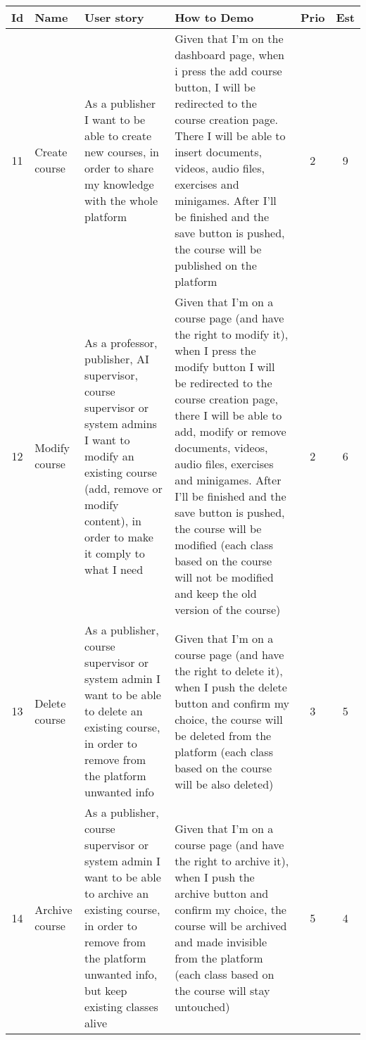 \begin{tabular}{|c|m{1.5cm}|m{4cm}|m{4cm}|c|c|}
	\hline
	\textbf{Id}&\textbf{Name}&\textbf{User story}&\textbf{How to Demo}&\textbf{Prio}&\textbf{Est}\\
	\hline
	11 & Create course & 
	As a publisher I want to be able to create new courses, in order to share my knowledge with the whole platform & 
	Given that I'm on the dashboard page, when i press the add course button, I will be redirected to the course creation page. There I will be able to insert documents, videos, audio files, exercises and minigames. After I'll be finished and the save button is pushed, the course will be published on the platform &
	2 & 9 \\
	\hline
	12 & Modify course & 
	As a professor, publisher, AI supervisor, course supervisor or system admins I want to modify an existing course (add, remove or modify content), in order to make it comply to what I need & 
	Given that I'm on a course page (and have the right to modify it), when I press the modify button I will be redirected to the course creation page, there I will be able to add, modify or remove documents, videos, audio files, exercises and minigames. After I'll be finished and the save button is pushed, the course will be modified (each class based on the course will not be modified and keep the old version of the course) &
	2 & 6 \\
	\hline
	13 & Delete course & 
	As a publisher, course supervisor or system admin I want to be able to delete an existing course, in order to remove from the platform unwanted info & 
	Given that I'm on a course page (and have the right to delete it), when I push the delete button and confirm my choice, the course will be deleted from the platform (each class based on the course will be also deleted) &
	3 & 5 \\
	\hline
	14 & Archive course & 
	As a publisher, course supervisor or system admin I want to be able to archive an existing course, in order to remove from the platform unwanted info, but keep existing classes alive & 
	Given that I'm on a course page (and have the right to archive it), when I push the archive button and confirm my choice, the course will be archived and made invisible from the platform (each class based on the course will stay untouched) &
	5 & 4 \\
	\hline
\end{tabular}    
